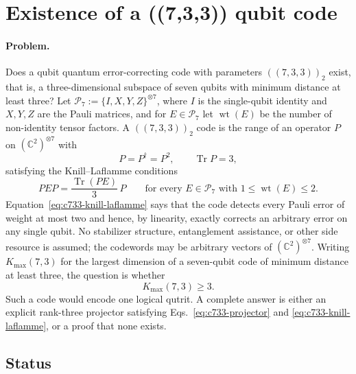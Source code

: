 \section{Existence of a ((7,3,3)) qubit code}
\label{sec:op_4765bc6f2ac91d46}

\paragraph{Problem.}
Does a qubit quantum error-correcting code with parameters $((7,3,3))_2$
exist, that is, a three-dimensional subspace of seven qubits with minimum
distance at least three?  Let $\mathcal{P}_7:=\{I,X,Y,Z\}^{\otimes7}$, where
$I$ is the single-qubit identity and $X,Y,Z$ are the Pauli matrices, and for
$E\in\mathcal{P}_7$ let $\operatorname{wt}(E)$ be the number of non-identity
tensor factors.  A $((7,3,3))_2$ code is the range of an operator $P$ on
$(\mathbb{C}^{2})^{\otimes7}$ with
\begin{equation}
  P=P^{\dagger}=P^{2},
  \qquad
  \operatorname{Tr}P=3,
  \label{eq:c733-projector}
\end{equation}
satisfying the Knill--Laflamme conditions
\begin{equation}
  PEP=\frac{\operatorname{Tr}(PE)}{3}\,P
  \qquad\text{for every }E\in\mathcal{P}_7\text{ with }
  1\leq\operatorname{wt}(E)\leq2.
  \label{eq:c733-knill-laflamme}
\end{equation}
Equation~\eqref{eq:c733-knill-laflamme} says that the code detects every
Pauli error of weight at most two and hence, by linearity, exactly corrects
an arbitrary error on any single qubit.  No stabilizer structure,
entanglement assistance, or other side resource is assumed; the codewords
may be arbitrary vectors of $(\mathbb{C}^{2})^{\otimes7}$.  Writing
$K_{\max}(7,3)$ for the largest dimension of a seven-qubit code of minimum
distance at least three, the question is whether
\begin{equation}
  K_{\max}(7,3)\geq3.
  \label{eq:c733-dimension}
\end{equation}
Such a code would encode one logical qutrit.  A complete answer is either
an explicit rank-three projector satisfying Eqs.~\eqref{eq:c733-projector}
and \eqref{eq:c733-knill-laflamme}, or a proof that none exists.

\subsection*{Status}

